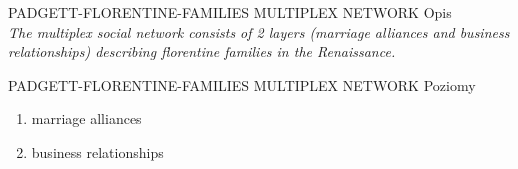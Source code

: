 \documentclass{beamer}
\begin{document}
\begin{frame}{PADGETT-FLORENTINE-FAMILIES
MULTIPLEX NETWORK}
Opis\\
\vspace{5mm}
\textit{The multiplex social network consists of 2 layers (marriage alliances and business
relationships) describing florentine families in the Renaissance.}
\end{frame}
\begin{frame}{PADGETT-FLORENTINE-FAMILIES
MULTIPLEX NETWORK}
Poziomy
\begin{enumerate}
\item marriage alliances
\item business relationships
\end{enumerate}
\end{frame}
\end{document}

